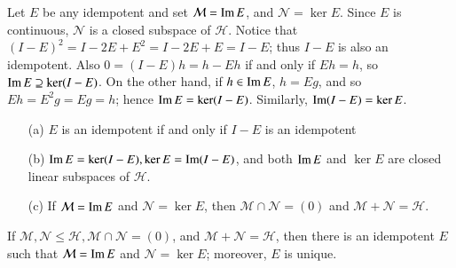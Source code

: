 Let $E$ be any idempotent and set $\mathcal{M} = \operatorname{Im} E$, and $\mathcal{N} = \ker E$. Since $E$ is continuous, $\mathcal{N}$ is a closed subspace of $\mathscr{H}$. Notice that $(I-E)^2 = I-2E+E^2 = I-2E+E = I-E$; thus $I-E$ is also an idempotent. Also $0 = (I-E)h = h-Eh$ if and only if $Eh = h$, so $\operatorname{Im} E \supseteq \ker(I-E)$. On the other hand, if $h \in \operatorname{Im} E$, $h = Eg$, and so $Eh = E^2g = Eg =h$; hence $\operatorname{Im} E = \ker(I-E)$. Similarly, $\operatorname{Im}(I-E) = \ker E$.

\begin{prop}
    \begin{enumerate}
        \item[(a)] $E$ is an idempotent if and only if $I-E$ is an idempotent
        \item[(b)] $\operatorname{Im} E = \ker(I-E), \ker E = \operatorname{Im}(I-E)$, and both $\operatorname{Im} E$ and $\ker E$ are closed linear subspaces of $\mathscr{H}$.
        \item[(c)] If $\mathcal{M} = \operatorname{Im} E$ and $\mathcal{N} = \ker E$, then $\mathcal{M}\cap \mathcal{N} = (0)$ and $\mathcal{M}+\mathcal{N} = \mathscr{H}$.
    \end{enumerate}
\end{prop}

If $\mathcal{M},\mathcal{N} \leq \mathscr{H},\mathcal{M}\cap\mathcal{N} = (0)$, and $\mathcal{M}+\mathcal{N} = \mathscr{H}$, then there is an idempotent $E$ such that $\mathcal{M} = \operatorname{Im} E$ and $\mathcal{N} = \ker E$; moreover, $E$ is unique.

